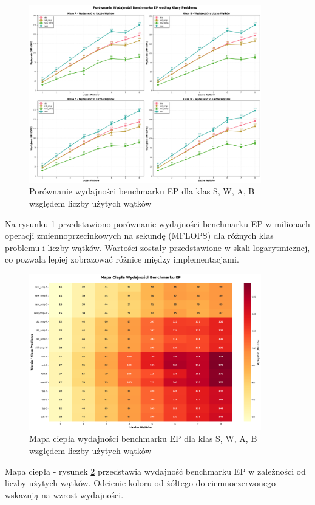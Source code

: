 \begin{figure}[H]
    \centering
    \includegraphics[width=0.9\textwidth]{analiza/images/parallel/ep/x86/ep_porownanie_wydajnosci.png}
    \caption{Porównanie wydajności benchmarku EP dla klas S, W, A, B względem liczby użytych wątków}
    \label{ep_porownanie_wydajnosci_x86_64}
\end{figure}
Na rysunku \ref{ep_porownanie_wydajnosci_x86_64} przedstawiono porównanie wydajności benchmarku EP w milionach operacji zmiennoprzecinkowych na sekundę (MFLOPS) dla różnych klas problemu i liczby wątków. Wartości zostały przedstawione w skali logarytmicznej, co pozwala lepiej zobrazować różnice między implementacjami.

\begin{figure}[H]
    \centering
    \includegraphics[width=0.9\textwidth]{analiza/images/parallel/ep/x86/ep_mapa_ciepla_wydajnosci.png}
    \caption{Mapa ciepła wydajności benchmarku EP dla klas S, W, A, B względem liczby użytych wątków}
    \label{ep_heatmap_wydajnosci_x86_64}
\end{figure}
Mapa ciepła - rysunek \ref{ep_heatmap_wydajnosci_x86_64} przedstawia wydajność benchmarku EP w zależności od liczby użytych wątków. Odcienie koloru od żółtego do ciemnoczerwonego wskazują na wzrost wydajności.\\


